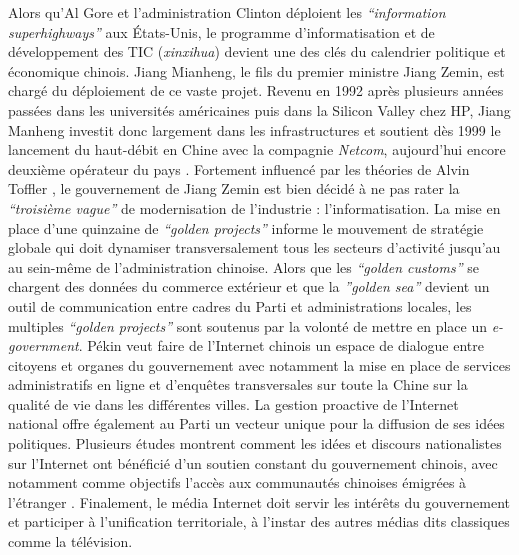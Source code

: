 Alors qu’Al Gore et l’administration Clinton déploient les \textit{“information superhighways”} aux États-Unis, le programme d’informatisation et de développement des TIC (\textit{xinxihua}) devient une des clés du calendrier politique et économique chinois. Jiang Mianheng, le fils du premier ministre Jiang Zemin, est chargé du déploiement de ce vaste projet. Revenu en 1992 après plusieurs années passées dans les universités américaines puis dans la Silicon Valley chez HP, Jiang Manheng investit donc largement dans les infrastructures et soutient dès 1999 le lancement du haut-débit en Chine avec la compagnie \textit{Netcom}, aujourd’hui encore deuxième opérateur du pays \citep{Dai2007}. Fortement influencé par les théories de Alvin Toffler \citep{Tsui2007}, le gouvernement de Jiang Zemin est bien décidé à ne pas rater la \textit{“troisième vague”} de modernisation de l’industrie : l’informatisation. La mise en place d’une quinzaine de \textit{“golden projects”} informe le mouvement de stratégie globale qui doit dynamiser transversalement tous les secteurs d’activité jusqu’au au sein-même de l’administration chinoise. Alors que les \textit{“golden customs”} se chargent des données du commerce extérieur et que la \textit{”golden sea”} devient un outil de communication entre cadres du Parti et administrations locales, les multiples \textit{“golden projects”} sont soutenus par la volonté de mettre en place un \textit{e-government}. Pékin veut faire de l’Internet chinois un espace de dialogue entre citoyens et organes du gouvernement avec notamment la mise en place de services administratifs en ligne et d’enquêtes transversales sur toute la Chine sur la qualité de vie dans les différentes villes. La gestion proactive de l’Internet national offre également au Parti un vecteur unique pour la diffusion de ses idées politiques. Plusieurs études montrent comment les idées et discours nationalistes sur l’Internet ont bénéficié d’un soutien constant du gouvernement chinois, avec notamment comme objectifs l’accès aux communautés chinoises émigrées à l’étranger \citep{Hughes2000}. Finalement, le média Internet doit servir les intérêts du gouvernement et participer à l’unification territoriale, à l’instar des autres médias dits classiques comme la télévision.

